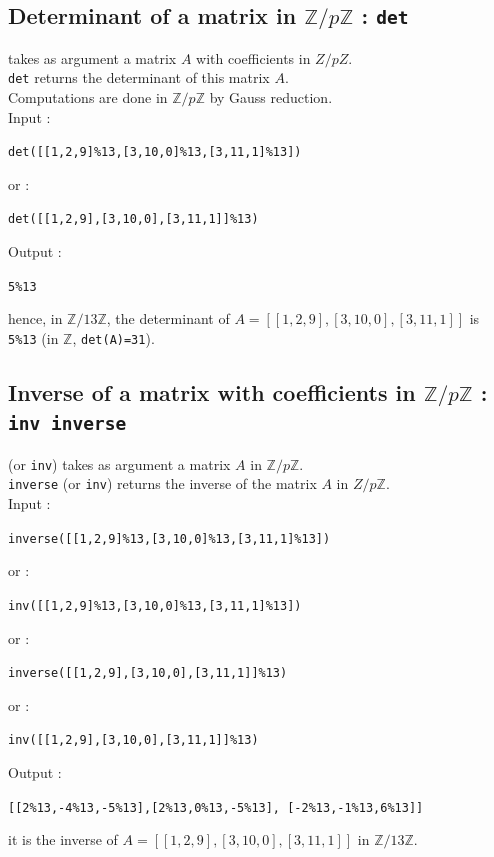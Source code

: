 \documentclass[a4paper,11pt]{book}
\newcommand{\Z}{{\mathbb{Z}}}
\begin{document}
\subsection{Determinant of a matrix in $\Z/p\Z$ : {\tt det}}
 takes as argument a matrix $A$ with coefficients in 
$Z/pZ$.\\
{\tt det} returns the determinant of this matrix $A$.\\
Computations are done in $\Z/p\Z$ by Gauss reduction.\\
Input :
\begin{center}{\tt det([[1,2,9]\%13,[3,10,0]\%13,[3,11,1]\%13])}\end{center} 
or :
\begin{center}{\tt det([[1,2,9],[3,10,0],[3,11,1]]\%13)}\end{center} 
Output :
\begin{center}{\tt 5\%13}\end{center} 
hence, in  $\Z/13\Z$, the determinant of  
$A=[[1,2,9],[3,10,0],[3,11,1]]$ is {\tt 5\%13} (in $\Z$, {\tt det(A)=31}).

\subsection{Inverse of a matrix with coefficients in $\Z/p\Z$ : {\tt inv inverse}}
 (or {\tt inv}) takes as argument a matrix $A$ in 
$\Z/p\Z$.\\
{\tt inverse} (or {\tt inv}) returns the inverse of the matrix 
$A$ in $Z/p\Z$.\\
Input :
\begin{center}{\tt inverse([[1,2,9]\%13,[3,10,0]\%13,[3,11,1]\%13])}\end{center} 
or :
\begin{center}{\tt inv([[1,2,9]\%13,[3,10,0]\%13,[3,11,1]\%13])}\end{center} 
or :
\begin{center}{\tt inverse([[1,2,9],[3,10,0],[3,11,1]]\%13)}\end{center} 
or :
\begin{center}{\tt inv([[1,2,9],[3,10,0],[3,11,1]]\%13)}\end{center}
Output :
\begin{center}{\tt [[2\%13,-4\%13,-5\%13],[2\%13,0\%13,-5\%13], [-2\%13,-1\%13,6\%13]]}\end{center} 
it is the inverse of $A=[[1,2,9],[3,10,0],[3,11,1]]$ in $\Z/13\Z$.
\end{document}
